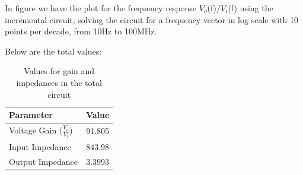 In figure we have the plot for the frequency response $V_o$(f)/$V_i$(f) using the incremental circuit, solving the circuit for a frequency vector in log scale with 10 points per decade, from 10Hz to 100MHz.

Below are the total values:

\begin{table}[h]
    \centering
    \begin{tabular}{|l|c|}
    \hline
    {\bf Parameter} & {\bf Value} \\ \hline \hline
    Voltage Gain ($\frac{V_{o}}{V_{i}}$)  & 91.805 \\ \hline
    Input Impedance & 843.98 \\ \hline
    Output Impedance  & 3.3993 \\ \hline
    \end{tabular}
    \caption{Values for gain and impedances in the total circuit}
    \label{tab:values}
\end{table}


  





